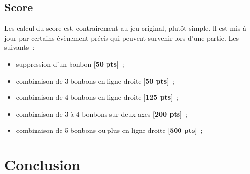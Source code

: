 \documentclass[11pt,a4paper]{article}
\begin{document}
\subsection{Score}

Les calcul du score est, contrairement au jeu original, plutôt simple.
Il est mis à jour par certains évènement précis qui peuvent
survenir lors d'une partie. Les suivants~:

\begin{itemize}
    \item suppression d'un bonbon [\textbf{50 pts}]~;
    \item combinaison de 3 bonbons en ligne droite [\textbf{50 pts}]~;
    \item combinaison de 4 bonbons en ligne droite [\textbf{125 pts}]~;
    \item combinaison de 3 à 4 bonbons sur deux axes [\textbf{200 pts}]~;
    \item combinaison de 5 bonbons ou plus en ligne droite [\textbf{500 pts}]~;
\end{itemize}

\section{Conclusion}
\end{document}
